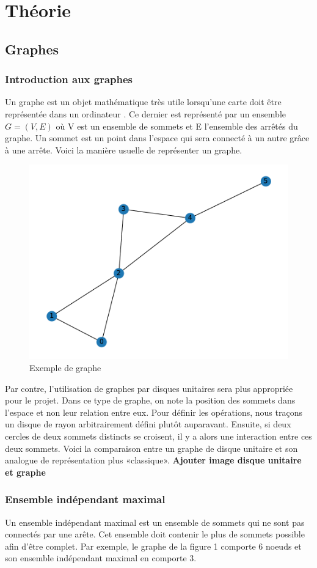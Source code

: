 \documentclass[11pt]{article}
\begin{document}
\section{Théorie}
\subsection{Graphes}
\subsubsection{Introduction aux graphes}
Un graphe est un objet mathématique très utile lorsqu'une carte doit être représentée dans un ordinateur \cite{mackaness_use_1993}\cite{riaz_applications_2011}. Ce dernier est représenté par un ensemble $G=(V,E)$ où V est un ensemble de sommets et E l'ensemble des arrêtés du graphe. Un sommet est un point dans l'espace qui sera connecté à un autre grâce à une arrête. Voici la manière usuelle de représenter un graphe.

\begin{figure}[H]
    \centering
        \includegraphics[width=0.45\linewidth]{images/graphe_MIS_exemple.pdf}
        \caption{Exemple de graphe}
    \label{graph_exemple}
\end{figure}

Par contre, l'utilisation de graphes par disques unitaires sera plus appropriée pour le projet. Dans ce type de graphe, on note la position des sommets dans l'espace et non leur relation entre eux. Pour définir les opérations, nous traçons un disque de rayon arbitrairement défini plutôt auparavant. Ensuite, si deux cercles de deux sommets distincts se croisent, il y a alors une interaction entre ces deux sommets. Voici la comparaison entre un graphe de disque unitaire et son analogue de représentation plus «classique».  \textbf{Ajouter image disque unitaire et graphe}

\subsubsection{Ensemble indépendant maximal}
Un ensemble indépendant maximal est un ensemble de sommets qui ne sont pas connectés par une arête. Cet ensemble doit contenir le plus de sommets possible afin d'être complet. Par exemple, le graphe de la figure 1 comporte 6 noeuds et son ensemble indépendant maximal en comporte 3.
 
\end{document}
